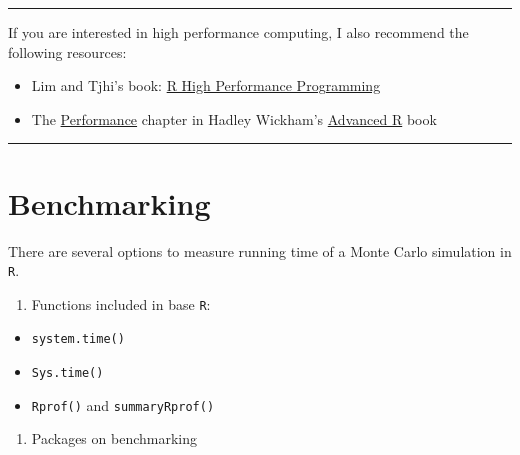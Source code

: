 \documentclass[
]{book}
\newenvironment{Shaded}{\begin{snugshade}}{\end{snugshade}}
\newcommand{\CommentTok}[1]{\textcolor[rgb]{0.56,0.35,0.01}{\textit{#1}}}
\newcommand{\KeywordTok}[1]{\textcolor[rgb]{0.13,0.29,0.53}{\textbf{#1}}}
\newcommand{\NormalTok}[1]{#1}
\providecommand{\tightlist}{%
  \setlength{\itemsep}{0pt}\setlength{\parskip}{0pt}}
\begin{document}
\begin{Shaded}
\begin{Highlighting}[]
{{{{{{{{{\CommentTok{# Stop the clusters}
\KeywordTok{stopCluster}\NormalTok{(cl)}
\end{Highlighting}
\end{Shaded}

\begin{center}\rule{0.5\linewidth}{0.5pt}\end{center}

If you are interested in high performance computing, I also recommend the following resources:

\begin{itemize}
\tightlist
\item
  Lim and Tjhi's book: \href{https://www.packtpub.com/application-development/r-high-performance-programming}{R High Performance Programming}
\item
  The \href{http://adv-r.had.co.nz/Performance.html}{Performance} chapter in Hadley Wickham's \href{http://adv-r.had.co.nz/}{Advanced R} book
\end{itemize}

\begin{center}\rule{0.5\linewidth}{0.5pt}\end{center}

\hypertarget{benchmarking}{%
\section{Benchmarking}\label{benchmarking}}

There are several options to measure running time of a Monte Carlo simulation in \texttt{R}.

\begin{enumerate}
\def\labelenumi{\arabic{enumi}.}
\tightlist
\item
  Functions included in base \texttt{R}:
\end{enumerate}

\begin{itemize}
\tightlist
\item
  \texttt{system.time()}
\item
  \texttt{Sys.time()}
\item
  \texttt{Rprof()} and \texttt{summaryRprof()}
\end{itemize}

\begin{enumerate}
\def\labelenumi{\arabic{enumi}.}
\setcounter{enumi}{1}
\tightlist
\item
  Packages on benchmarking
\end{enumerate}
\end{document}
